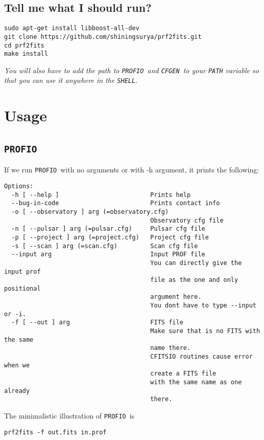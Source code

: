 \documentclass{article}
\newcommand{\prf}{\texttt{PROFIO}\ }
\newcommand{\cfgen}{\texttt{CFGEN}\ }
\begin{document}
\subsection*{\hfill Tell me what I should run?}
\begin{lstlisting}
sudo apt-get install libboost-all-dev 
git clone https://github.com/shiningsurya/prf2fits.git 
cd prf2fits 
make install 
\end{lstlisting}
\par \textit{You will also have to add the path to \prf and \cfgen to your \texttt{PATH} variable so that you can use it anywhere in the \texttt{SHELL}.}
\section*{\hfill Usage}
\subsection*{\hfill \prf}
\par If we run \prf with no arguments or with -h argument, it prints the following:
\begin{lstlisting}
Options:
  -h [ --help ]                         Prints help
  --bug-in-code                         Prints contact info
  -o [ --observatory ] arg (=observatory.cfg)
                                        Observatory cfg file
  -n [ --pulsar ] arg (=pulsar.cfg)     Pulsar cfg file
  -p [ --project ] arg (=project.cfg)   Project cfg file
  -s [ --scan ] arg (=scan.cfg)         Scan cfg file
  --input arg                           Input PROF file
                                        You can directly give the input prof 
                                        file as the one and only positional 
                                        argument here.
                                        You dont have to type --input or -i.
  -f [ --out ] arg                      FITS file
                                        Make sure that is no FITS with the same
                                        name there.
                                        CFITSIO routines cause error when we 
                                        create a FITS file 
                                        with the same name as one already 
                                        there.
\end{lstlisting}
\par The minimalistic illustration of \prf is 
\begin{lstlisting}
prf2fits -f out.fits in.prof 
\end{lstlisting}
\end{document}
